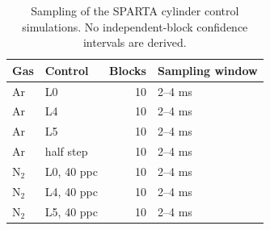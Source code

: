 \begin{table}
\centering\small
\caption{Sampling of the SPARTA cylinder control simulations. No independent-block confidence intervals are derived.}\label{tab:app_block_ci_clean}
\begin{tabular}{llrl}\toprule
Gas & Control & Blocks & Sampling window\\\midrule
Ar & L0 & 10 & 2--4 ms\\
Ar & L4 & 10 & 2--4 ms\\
Ar & L5 & 10 & 2--4 ms\\
Ar & half step & 10 & 2--4 ms\\
N$_2$ & L0, 40 ppc & 10 & 2--4 ms\\
N$_2$ & L4, 40 ppc & 10 & 2--4 ms\\
N$_2$ & L5, 40 ppc & 10 & 2--4 ms\\
\bottomrule\end{tabular}
\end{table}
